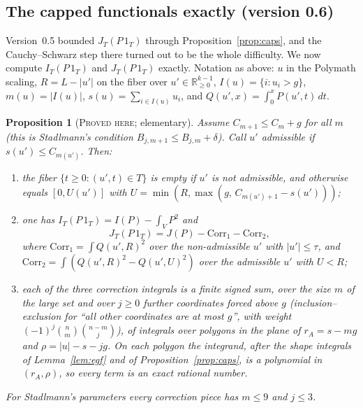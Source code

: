 \documentclass[11pt]{amsart}
\newtheorem{proposition}[theorem]{Proposition}
\theoremstyle{definition}
\theoremstyle{remark}
\newcommand{\lbl}[1]{\textup{\textsc{#1}}}
\begin{document}
\subsection*{The capped functionals exactly (version 0.6)}
Version~0.5 bounded $J_T(P\,1_T)$ through Proposition~\ref{prop:caps}, and the
Cauchy--Schwarz step there turned out to be the whole difficulty. We now
compute $I_T(P\,1_T)$ and $J_T(P\,1_T)$ exactly. Notation as above: $u$ in the
Polymath scaling, $R=L-|u'|$ on the fiber over $u'\in\mathbb R_{\ge0}^{k-1}$,
$I(u)=\{i:u_i>g\}$, $m(u)=|I(u)|$, $s(u)=\sum_{i\in I(u)}u_i$, and
$Q(u',x)=\int_0^xP(u',t)\,dt$.

\begin{proposition}[\lbl{Proved here}; elementary]\label{prop:exact}
Assume $C_{m+1}\le C_m+g$ for all $m$ (this is Stadlmann's condition
$B_{j,m+1}\le B_{j,m}+\delta$). Call $u'$ \emph{admissible} if $s(u')\le
C_{m(u')}$. Then:
\begin{enumerate}
\item the fiber $\{t\ge0:(u',t)\in T\}$ is empty if $u'$ is not admissible,
and otherwise equals $[0,U(u')]$ with
$U=\min\left(R,\max(g,\,C_{m(u')+1}-s(u'))\right)$;
\item one has $I_T(P\,1_T)=I(P)-\int_VP^2$ and
\[J_T(P\,1_T)=J(P)-\mathrm{Corr}_1-\mathrm{Corr}_2,\]
where
$\mathrm{Corr}_1=\int Q(u',R)^2$ over the non-admissible $u'$ with
$|u'|\le\tau$, and
$\mathrm{Corr}_2=\int\left(Q(u',R)^2-Q(u',U)^2\right)$ over the admissible $u'$ with $U<R$;
\item each of the three correction integrals is a finite signed sum, over the
size $m$ of the large set and over $j\ge0$ further coordinates forced above
$g$ (inclusion--exclusion for ``all other coordinates are at most $g$'', with
weight $(-1)^j\binom nm\binom{n-m}{j}$), of integrals over polygons in the
plane of $r_A=s-mg$ and $\rho=|u|-s-jg$. On each polygon the integrand,
after the shape integrals of Lemma~\ref{lem:egf} and of
Proposition~\ref{prop:caps}, is a polynomial in $(r_A,\rho)$, so every term
is an exact rational number.
\end{enumerate}
For Stadlmann's parameters every correction piece has $m\le9$ and $j\le3$.
\end{proposition}
\end{document}
